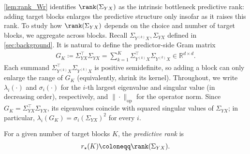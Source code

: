  
\cref{lem:rank_Wr} identifies $\rank(\Sigma_{YX})$ as the intrinsic bottleneck predictive rank:
adding target blocks enlarges the predictive structure only insofar as it raises
this rank. 
To study how $\rank(\Sigma_{YX})$ depends on the choice and number of
target blocks, we aggregate across blocks. 
Recall $\Sigma_{Y^{(k)}X}, \Sigma_{YX}$ defined in \cref{sec:background}.
It is natural to define the predictor-side Gram matrix
\begin{align}
    G_K
    \coloneqq
    \Sigma_{YX}^\top \Sigma_{YX}
    =
    \sum_{k=1}^K
    \Sigma_{Y^{(k)}X}^\top \Sigma_{Y^{(k)}X}
    \in \mathbb R^{d \times d}.
    \label{eq:predictor_side_gram}
\end{align}
Each summand $\Sigma_{Y^{(k)}X}^\top \Sigma_{Y^{(k)}X}$ is positive
semidefinite, so adding a block can only enlarge the range of $G_K$
(equivalently, shrink its kernel).
Throughout, we write $\lambda_i(\cdot)$ and $\sigma_i(\cdot)$ for the $i$-th largest eigenvalue and singular value (in decreasing order), respectively, and $\|\cdot\|_\mathrm{op}$ for the operator norm. 
Since $G_K = \Sigma_{YX}^\top \Sigma_{YX}$, its eigenvalues coincide with squared singular values of $\Sigma_{YX}$; in particular, $\lambda_i(G_K) = \sigma_i(\Sigma_{YX})^2$ for every $i$.



\begin{definition}
\label{def:predictive_rank}
For a given number of target blocks $K$, the \emph{predictive rank} is
\begin{align*}
    r_\star(K) \coloneqq \rank(\Sigma_{YX}).
\end{align*}
\end{definition}

